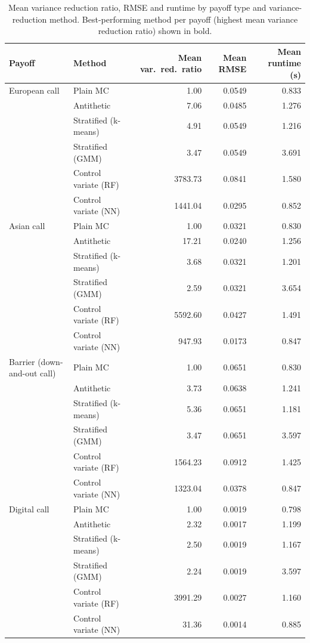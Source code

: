 \begin{table}[ht]
\centering
\caption{Mean variance reduction ratio, RMSE and runtime by payoff type and variance-reduction method. Best-performing method per payoff (highest mean variance reduction ratio) shown in bold.}
\label{tab:by_payoff}
\begin{tabular}{llrrr}
\toprule
Payoff & Method & Mean var.\ red.\ ratio & Mean RMSE & Mean runtime (s) \\
\midrule
European call & Plain MC & 1.00 & 0.0549 & 0.833 \\
 & Antithetic & 7.06 & 0.0485 & 1.276 \\
 & Stratified (k-means) & 4.91 & 0.0549 & 1.216 \\
 & Stratified (GMM) & 3.47 & 0.0549 & 3.691 \\
 & Control variate (RF) & 3783.73 & 0.0841 & 1.580 \\
 & Control variate (NN) & 1441.04 & 0.0295 & 0.852 \\
\addlinespace
Asian call & Plain MC & 1.00 & 0.0321 & 0.830 \\
 & Antithetic & 17.21 & 0.0240 & 1.256 \\
 & Stratified (k-means) & 3.68 & 0.0321 & 1.201 \\
 & Stratified (GMM) & 2.59 & 0.0321 & 3.654 \\
 & Control variate (RF) & 5592.60 & 0.0427 & 1.491 \\
 & Control variate (NN) & 947.93 & 0.0173 & 0.847 \\
\addlinespace
Barrier (down-and-out call) & Plain MC & 1.00 & 0.0651 & 0.830 \\
 & Antithetic & 3.73 & 0.0638 & 1.241 \\
 & Stratified (k-means) & 5.36 & 0.0651 & 1.181 \\
 & Stratified (GMM) & 3.47 & 0.0651 & 3.597 \\
 & Control variate (RF) & 1564.23 & 0.0912 & 1.425 \\
 & Control variate (NN) & 1323.04 & 0.0378 & 0.847 \\
\addlinespace
Digital call & Plain MC & 1.00 & 0.0019 & 0.798 \\
 & Antithetic & 2.32 & 0.0017 & 1.199 \\
 & Stratified (k-means) & 2.50 & 0.0019 & 1.167 \\
 & Stratified (GMM) & 2.24 & 0.0019 & 3.597 \\
 & Control variate (RF) & 3991.29 & 0.0027 & 1.160 \\
 & Control variate (NN) & 31.36 & 0.0014 & 0.885 \\
\bottomrule
\end{tabular}
\end{table}
